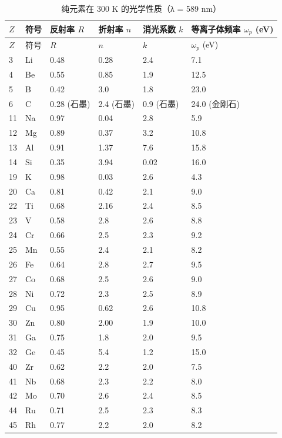 \documentclass[12pt,a4paper]{article}
\begin{document}
	\begin{longtable}{p{0.8cm}p{1.2cm}p{2.2cm}p{2.2cm}p{2.2cm}p{2.2cm}}
		\caption{纯元素在 300 K 的光学性质（λ = 589 nm）} \label{tab:optical-properties-func} \\
		\toprule
		\(Z\) & 符号 & 反射率 \(R\) & 折射率 \(n\) & 消光系数 \(k\) & 等离子体频率 \(\omega_p\) (eV) \\
		\midrule
		\endfirsthead
		\toprule
		\(Z\) & 符号 & \(R\) & \(n\) & \(k\) & \(\omega_p\) (eV) \\
		\midrule
		\endhead
		3  & Li & 0.48 & 0.28 & 2.4 & 7.1 \\
		4  & Be & 0.55 & 0.85 & 1.9 & 12.5 \\
		5  & B  & 0.42 & 3.0 & 1.8 & 23.0 \\
		6  & C  & 0.28 (石墨) & 2.4 (石墨) & 0.9 (石墨) & 24.0 (金刚石) \\
		11 & Na & 0.97 & 0.04 & 2.8 & 5.9 \\
		12 & Mg & 0.89 & 0.37 & 3.2 & 10.8 \\
		13 & Al & 0.91 & 1.37 & 7.6 & 15.8 \\
		14 & Si & 0.35 & 3.94 & 0.02 & 16.0 \\
		19 & K  & 0.98 & 0.03 & 2.6 & 4.3 \\
		20 & Ca & 0.81 & 0.42 & 2.1 & 9.0 \\
		22 & Ti & 0.68 & 2.16 & 2.4 & 8.5 \\
		23 & V  & 0.58 & 2.8 & 2.6 & 8.8 \\
		24 & Cr & 0.66 & 2.5 & 2.3 & 9.2 \\
		25 & Mn & 0.55 & 2.4 & 2.1 & 8.2 \\
		26 & Fe & 0.64 & 2.8 & 2.7 & 9.5 \\
		27 & Co & 0.68 & 2.5 & 2.6 & 9.0 \\
		28 & Ni & 0.72 & 2.3 & 2.5 & 8.9 \\
		29 & Cu & 0.95 & 0.62 & 2.6 & 10.8 \\
		30 & Zn & 0.80 & 2.00 & 1.9 & 10.0 \\
		31 & Ga & 0.75 & 1.8 & 2.0 & 9.5 \\
		32 & Ge & 0.45 & 5.4 & 1.2 & 15.0 \\
		40 & Zr & 0.62 & 2.2 & 2.0 & 7.5 \\
		41 & Nb & 0.68 & 2.3 & 2.2 & 8.0 \\
		42 & Mo & 0.70 & 2.6 & 2.4 & 8.5 \\
		44 & Ru & 0.71 & 2.5 & 2.3 & 8.3 \\
		45 & Rh & 0.77 & 2.2 & 2.0 & 8.2 \\

\end{longtable}
\end{document}
